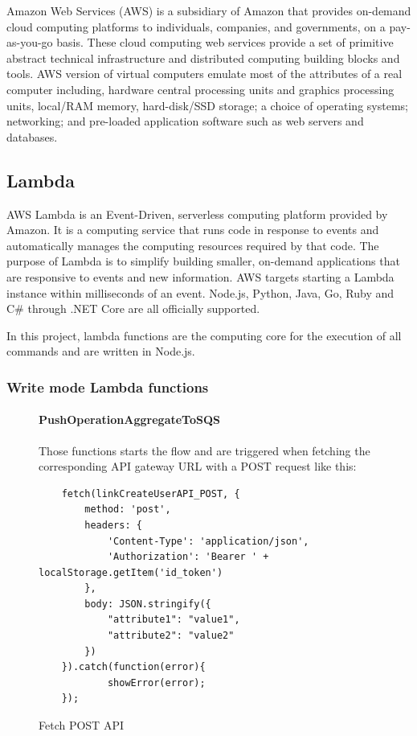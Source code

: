 Amazon Web Services (AWS) is a subsidiary of Amazon that provides on-demand cloud computing platforms to individuals, companies, and governments, on a pay-as-you-go basis. These cloud computing web services provide a set of primitive abstract technical infrastructure and distributed computing building blocks and tools. AWS version of virtual computers emulate most of the attributes of a real computer including, hardware central processing units and graphics processing units, local/RAM memory, hard-disk/SSD storage; a choice of operating systems; networking; and pre-loaded application software such as web servers and databases.

\subsection{Lambda}
AWS Lambda is an Event-Driven, serverless computing platform provided by Amazon. It is a computing service that runs code in response to events and automatically manages the computing resources required by that code. The purpose of Lambda is to simplify building smaller, on-demand applications that are responsive to events and new information. AWS targets starting a Lambda instance within milliseconds of an event. Node.js, Python, Java, Go, Ruby and C\# through .NET Core are all officially supported.

In this project, lambda functions are the computing core for the execution of all commands and are written in Node.js.

\subsubsection{Write mode Lambda functions}
\begin{figure} [H]
\paragraph{PushOperationAggregateToSQS} \Spazio
Those functions starts the flow and are triggered when fetching the corresponding API gateway URL with a POST request like this: \\
\begin{lstlisting}
	fetch(linkCreateUserAPI_POST, {
		method: 'post',
		headers: {
			'Content-Type': 'application/json',
			'Authorization': 'Bearer ' + localStorage.getItem('id_token')
		},	
		body: JSON.stringify({
			"attribute1": "value1",
			"attribute2": "value2" 
		})
	}).catch(function(error){
			showError(error);
	});
\end{lstlisting}
	\caption{Fetch POST API}\label{}
\end{figure}

